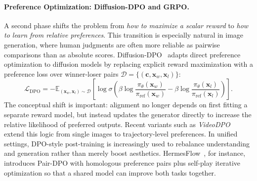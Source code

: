 \documentclass{llmxive}
\providecommand{\vx}{\mathbf{x}}
\providecommand{\vc}{\mathbf{c}}
\begin{document}
\paragraph{Preference Optimization: Diffusion-DPO and GRPO.}
A second phase shifts the problem from \emph{how to maximize a scalar reward} to \emph{how to learn from relative preferences}. This transition is especially natural in image generation, where human judgments are often more reliable as pairwise comparisons than as absolute scores. Diffusion-DPO~\citep{wallace2024diffusion} adapts direct preference optimization to diffusion models by replacing explicit reward maximization with a preference loss over winner-loser pairs $\mathcal{D} = \{(\vc, \vx_w, \vx_l)\}$:
\begin{equation}
    \mathcal{L}_{\text{DPO}} = - \mathbb{E}_{(\vx_w, \vx_l) \sim \mathcal{D}} \left[ \log \sigma \left( \beta \log \frac{\pi_\theta(\vx_w)}{\pi_{\text{ref}}(\vx_w)} - \beta \log \frac{\pi_\theta(\vx_l)}{\pi_{\text{ref}}(\vx_l)} \right) \right].
\end{equation}
The conceptual shift is important: alignment no longer depends on first fitting a separate reward model, but instead updates the generator directly to increase the relative likelihood of preferred outputs. Recent variants such as \textit{VideoDPO}~\citep{liu2025videodpo} extend this logic from single images to trajectory-level preferences. In unified settings, DPO-style post-training is increasingly used to rebalance understanding and generation rather than merely boost aesthetics. HermesFlow~\citep{yang2025hermesflow}, for instance, introduces Pair-DPO with homologous preference pairs plus self-play iterative optimization so that a shared model can improve both tasks together.
\end{document}
